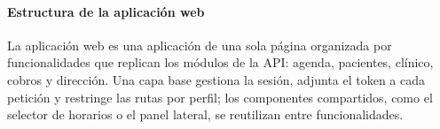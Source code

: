 \paragraph{Estructura de la aplicación web}

La aplicación web es una aplicación de una sola página organizada por funcionalidades que replican los módulos de la API: agenda, pacientes, clínico, cobros y dirección. Una capa base gestiona la sesión, adjunta el token a cada petición y restringe las rutas por perfil; los componentes compartidos, como el selector de horarios o el panel lateral, se reutilizan entre funcionalidades.
